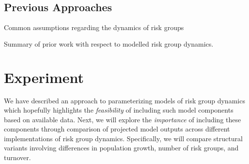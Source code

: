 \documentclass[10pt]{article}
\numberwithin{equation}{section}
\newcommand{\G}{{\mbox{\footnotesize{\textit{G}}}}}
\newcommand{\tab}[1]{Table~\ref{#1}}
\begin{document}
\subsection{Previous Approaches}
\begin{floatbox}
  \caption{Common assumptions regarding the dynamics of risk groups}
  \label{box:assumptions}
  
\end{floatbox}
\begin{table}
  \centering
  \caption{Summary of prior work with respect to modelled risk group dynamics.}
  \label{tab:prior-work}
  
\end{table}
\clearpage
\section{Experiment}\label{s:exp}
We have described an approach to parameterizing models of risk group dynamics
which hopefully highlights the
\textit{feasibility} of including such model components based on available data.
Next, we will explore the
\textit{importance} of including these components
through comparison of projected model outputs
across different implementations of risk group dynamics.
Specifically, we will compare structural variants
involving differences in population growth, number of risk groups, and turnover.
\end{document}
